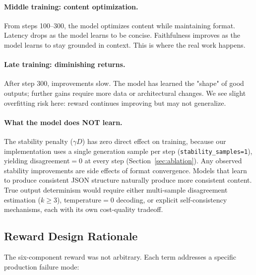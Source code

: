 \documentclass[11pt]{article}
\begin{document}
\paragraph{Middle training: content optimization.}
From steps 100--300, the model optimizes content while maintaining format.
Latency drops as the model learns to be concise.
Faithfulness improves as the model learns to stay grounded in context.
This is where the real work happens.

\paragraph{Late training: diminishing returns.}
After step 300, improvements slow.
The model has learned the "shape" of good outputs; further gains require more data or architectural changes.
We see slight overfitting risk here: reward continues improving but may not generalize.

\paragraph{What the model does NOT learn.}
The stability penalty ($\gamma D$) has zero direct effect on training, because our implementation uses a single generation sample per step (\texttt{stability\_samples=1}), yielding disagreement${}=0$ at every step (Section~\ref{sec:ablation}).  Any observed stability improvements are side effects of format convergence.  Models that learn to produce consistent JSON structure naturally produce more consistent content.  True output determinism would require either multi-sample disagreement estimation ($k \geq 3$), temperature${}=0$ decoding, or explicit self-consistency mechanisms, each with its own cost-quality tradeoff.

\subsection{Reward Design Rationale}

The six-component reward was not arbitrary.
Each term addresses a specific production failure mode:
\end{document}
